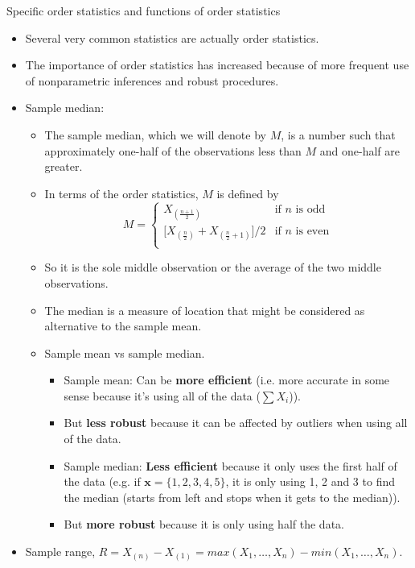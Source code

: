\documentclass{article}
\newcommand{\vecn}[2]{#1_1, \ldots, #1_{#2}}	%
\newcommand{\order}[2]{#1_{(#2)}}		%
\begin{document}
Specific order statistics and functions of order statistics\bigskip
\begin{itemize}
    \item Several very common statistics are actually order statistics.
    \item[] The importance of order statistics has increased because of more frequent use of nonparametric inferences and robust procedures.
    \item Sample median: 
    \begin{itemize}
        \item The sample median, which we will denote by $M$, is a number such that approximately one-half of the observations less than $M$ and one-half are greater.
        \item In terms of the order statistics, $M$ is defined by
        \[M =
        \left\{
        \begin{array}{ll}
            \order{X}{\frac{n+1}{2}} & \text{if $n$ is odd}\\
            \big[\order{X}{\frac{n}{2}} + \order{X}{\frac{n}{2} + 1}\big] / 2 & \text{if $n$ is even}\\
        \end{array}
        \right.\]
        \item[] So it is the sole middle observation or the average of the two middle observations.
        \item The median is a measure of location that might be considered as alternative to the sample mean.
        \item Sample mean vs sample median.
	\begin{itemize}
            \item Sample mean: Can be \textbf{more efficient} (i.e. more accurate in some sense because it's using all of the data ($\sum X_i$)).
            \item[] But \textbf{less robust} because it can be affected by outliers when using all of the data.
            \item Sample median: \textbf{Less efficient} because it only uses the first half of the data (e.g. if $\boldsymbol{x} = \{1, 2, 3, 4, 5\}$, it is only using 1, 2 and 3 to find the median (starts from left and stops when it gets to the median)).
            \item[] But \textbf{more robust} because it is only using half the data.
        \end{itemize}
        \end{itemize}
    \item Sample range, $R = \order{X}{n} - \order{X}{1} = max(\vecn{X}{n}) - min(\vecn{X}{n})$.

\end{itemize}
\end{document}

